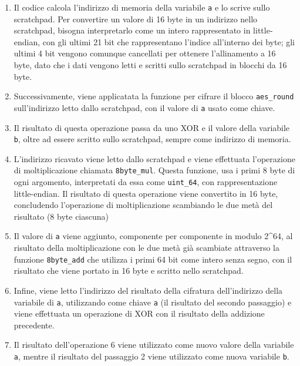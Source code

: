 \begin{enumerate}
\def\labelenumi{\arabic{enumi}.}
\item
  Il codice calcola l'indirizzo di memoria della variabile \texttt{a} e
  lo scrive sullo scratchpad. Per convertire un valore di 16 byte in un
  indirizzo nello scratchpad, bisogna interpretarlo come un intero
  rappresentato in little-endian, con gli ultimi 21 bit che
  rappresentano l'indice all'interno dei byte; gli ultimi 4 bit vengono
  comunque cancellati per ottenere l'allinamento a 16 byte, dato che i
  dati vengono letti e scritti sullo scratchpad in blocchi da 16 byte.
\item
  Successivamente, viene applicatata la funzione per cifrare il blocco
  \texttt{aes\_round} sull'indirizzo letto dallo scratchpad, con il
  valore di \texttt{a} usato come chiave.
\item
  Il risultato di questa operazione passa da uno XOR e il valore della
  variabile \texttt{b}, oltre ad essere scritto sullo scratchpad, sempre
  come indirizzo di memoria.
\item
  L'indirizzo ricavato viene letto dallo scratchpad e viene effettuata
  l'operazione di moltiplicazione chiamata \texttt{8byte\_mul}. Questa
  funzione, usa i primi 8 byte di ogni argomento, interpretati da essa
  come \texttt{uint\_64}, con rappresentazione little-endian. Il
  risultato di questa operazione viene convertito in 16 byte,
  concludendo l'operazione di moltiplicazione scambiando le due metà del
  risultato (8 byte ciascuna)
\item
  Il valore di \texttt{a} viene aggiunto, componente per componente in
  modulo 2\^{}64, al risultato della moltiplicazione con le due metà già
  scambiate attraverso la funzione \texttt{8byte\_add} che utilizza i
  primi 64 bit come intero senza segno, con il risultato che viene
  portato in 16 byte e scritto nello scratchpad.
\item
  Infine, viene letto l'indirizzo del risultato della cifratura
  dell'indirizzo della variabile di \texttt{a}, utilizzando come chiave
  \texttt{a} (il risultato del secondo passaggio) e viene effettuata un
  operazione di XOR con il risultato della addizione precedente.
\item
  Il risultato dell'operazione 6 viene utilizzato come nuovo valore
  della variabile \texttt{a}, mentre il risultato del passaggio 2 viene
  utilizzato come nuova variabile \texttt{b}.
\end{enumerate}



